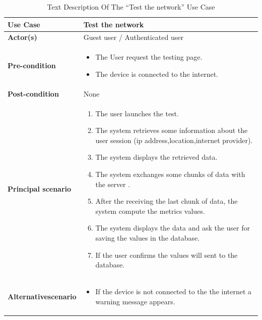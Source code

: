 \begin{table}[H]
    \renewcommand{\arraystretch}{1.5}
    
   \begin{tabular}{|p{}|p{}|}
   \hline
     
        \textbf{Use Case} & Test the network  \\   \hline
        
        \textbf{Actor(s) } & Guest user / Authenticated user   \\   \hline
        \textbf{Pre-condition} & 
           \begin{itemize}[left=0pt, label={\textbf{\Huge .}}]
            \item  The User request the testing page.
            \item  The device is connected to the internet.
        \end{itemize} 
        \\  \hline
        \textbf{Post-condition} & None \\   \hline


                \textbf{Principal scenario} &
                \begin{enumerate}[left=0pt]
                    \item The user launches the test.
                    \item The system retrieves some information about the user session (ip address,location,internet provider).
                    \item The system displays the retrieved data.
                    \item The system exchanges some chunks of data with the server .
                    \item After the receiving the last chunk of data, the system compute the metrics values.
                    \item The system displays the data and ask the user for saving the values in the database.
                    \item If the user confirms the values will sent to the database.
                
                    \end{enumerate}  \\   \hline

                     \textbf{Alternative\newline scenario} & 
        \begin{itemize}[left=0pt, label={\textbf{\Huge .}}]
            \item  If the device is not connected to the the internet a warning message appears.
        \end{itemize} \\   \hline
       
\end{tabular}

     \caption{Text Description Of The “Test the network” Use Case}
    \label{tab:my_label}
    
\end{table}

